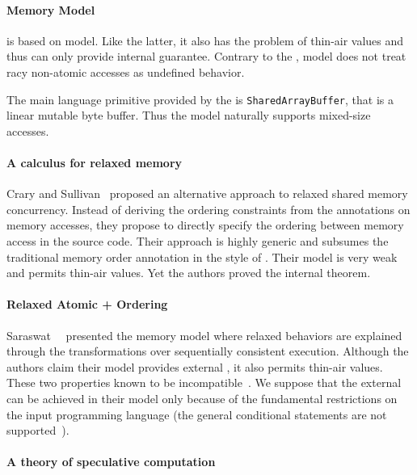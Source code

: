 \paragraph{\JS Memory Model}

\JSMM is based on \CMM model. 
Like the latter, it also has the problem of thin-air values
and thus can only provide internal \DRF guarantee. 
Contrary to the \CMM, \JS model does not treat 
racy non-atomic accesses as undefined behavior. 

The main language primitive provided by the \JSMM
is \texttt{SharedArrayBuffer}, that is a linear mutable byte buffer.
Thus the model naturally supports mixed-size accesses.

\paragraph{A calculus for relaxed memory}

Crary and Sullivan~\cite{Crary-Sullivan:POPL15} proposed 
an alternative approach to relaxed shared memory concurrency.
Instead of deriving the ordering constraints from the annotations 
on memory accesses, they propose to directly specify 
the ordering between memory access in the source code. 
Their approach is highly generic and subsumes 
the traditional memory order annotation in the style of \CMM.
Their model is very weak and permits thin-air values. 
Yet the authors proved the internal \DRF theorem.

\paragraph{Relaxed Atomic + Ordering}

Saraswat~\etal~\cite{Saraswat-al:PPoPP07} presented the \RAO memory model
where relaxed behaviors are explained through the transformations 
over sequentially consistent execution.
Although the authors claim their model provides external \DRF,
it also permits thin-air values. 
These two properties known to be incompatible~\cite{Batty-al:ESOP15}.
We suppose that the external \DRF can be achieved in their model 
only because of the fundamental restrictions on the input programming language 
(\eg the general conditional statements are not supported~\cite{PichonPharabod-Sewell:POPL16}). 

\paragraph{A theory of speculative computation}

